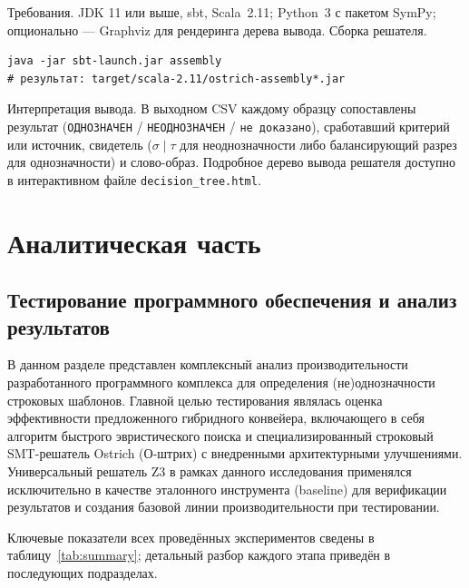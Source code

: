 \documentclass[14pt, russian]{scrartcl}
\begin{document}
Требования. JDK 11 или выше, sbt, Scala~2.11; Python~3 с пакетом SymPy;
опционально --- Graphviz для рендеринга дерева вывода.
Сборка решателя.
\begin{Verbatim}[breaklines=true, fontsize=\small]
java -jar sbt-launch.jar assembly
# результат: target/scala-2.11/ostrich-assembly*.jar
\end{Verbatim}

Интерпретация вывода. В выходном CSV каждому образцу сопоставлены результат
(\texttt{ОДНОЗНАЧЕН} / \texttt{НЕОДНОЗНАЧЕН} / \texttt{не доказано}), сработавший
критерий или источник, свидетель ($\sigma\mid\tau$ для неоднозначности либо
балансирующий разрез для однозначности) и слово-образ. Подробное дерево вывода
решателя доступно в интерактивном файле \texttt{decision\_tree.html}.

\section{Аналитическая часть}
\subsection{Тестирование программного обеспечения и анализ результатов}

В данном разделе представлен комплексный анализ производительности разработанного программного комплекса для определения (не)однозначности строковых шаблонов. Главной целью тестирования являлась оценка эффективности предложенного гибридного конвейера, включающего в себя алгоритм быстрого эвристического поиска и специализированный строковый SMT-решатель Ostrich (О-штрих) с внедренными архитектурными улучшениями. Универсальный решатель Z3 в рамках данного исследования применялся исключительно в качестве эталонного инструмента (baseline) для верификации результатов и создания базовой линии производительности при тестировании.

Ключевые показатели всех проведённых экспериментов сведены в
таблицу~\ref{tab:summary}; детальный разбор каждого этапа приведён в последующих
подразделах.
\end{document}
